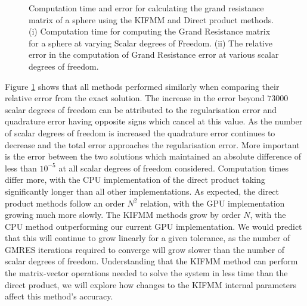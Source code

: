 \begin{figure}[ht]
\begin{subfigure}[b]{0.49\textwidth}
         \caption{\label{fig:DirectProductComperror}}
     \end{subfigure}
        \caption[Computation time and error for calculating the grand resistance matrix of a sphere using the KIFMM and Direct product methods.]{Computation time and error for calculating the grand resistance matrix of a sphere using the KIFMM and Direct product methods. (i) Computation time for computing the Grand Resistance matrix for a sphere at varying Scalar degrees of Freedom. (ii) The relative error in the computation of Grand Resistance error at various scalar degrees of freedom.}
        \label{fig:DirectProduct}
\end{figure}

Figure \ref{fig:DirectProductComperror} shows that all methods performed similarly when comparing their relative error from the exact solution. The increase in the error beyond $73000$ scalar degrees of freedom can be attributed to the regularisation error and quadrature error having opposite signs which cancel at this value. As the number of scalar degrees of freedom is increased the quadrature error continues to decrease and the total error approaches the regularisation error. More important is the error between the two solutions which maintained an absolute difference of less than $10^{-5}$ at all scalar degrees of freedom considered. Computation times differ more, with the CPU implementation of the direct product taking significantly longer than all other implementations. As expected, the direct product methods follow an order $N^2$ relation, with the GPU implementation growing much more slowly. The KIFMM methods grow by order $N$, with the CPU method outperforming our current GPU implementation. We would predict that this will continue to grow linearly for a given tolerance, as the number of GMRES iterations required to converge will grow slower than the number of scalar degrees of freedom. Understanding that the KIFMM method can perform the matrix-vector operations needed to solve the system in less time than the direct product, we will explore how changes to the KIFMM internal parameters affect this method's accuracy. 


